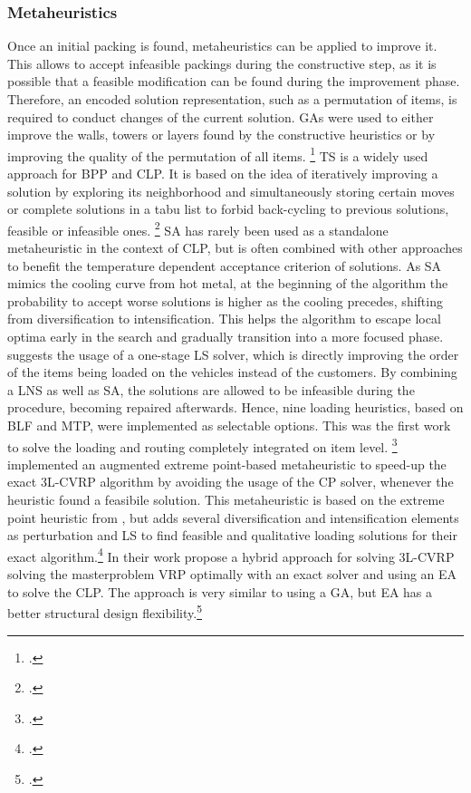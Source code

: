 \subsubsection{Metaheuristics}
Once an initial packing is found, metaheuristics can be applied to improve it.
This allows to accept infeasible packings during the constructive step,
as it is possible that a feasible modification can be found during the improvement phase.
Therefore, an encoded solution representation, such as a permutation of items, is required
to conduct changes of the current solution. \Glspl{GA} were
used to either improve the walls, towers or layers found by the constructive heuristics
or by improving the quality of the permutation of all items. \footcite[cf.][]{gehring_genetic_1997}
\Gls{TS} is a widely used approach for \gls{BPP} and \gls{CLP}. It is based on
the idea of iteratively improving a solution by exploring its neighborhood and simultaneously
storing certain moves or complete solutions in a tabu list to forbid back-cycling to
previous solutions, feasible or infeasible ones. \footcite[cf.][p. 344f]{gendreau_tabu_2006}
\Gls{SA} has rarely been used as a standalone metaheuristic in the context of \gls{CLP}, but is often
combined with other approaches to benefit the temperature dependent acceptance criterion of
solutions. As \gls{SA} mimics the cooling curve from hot metal, at the beginning of the algorithm the probability
to accept worse solutions is higher as the cooling precedes, shifting from diversification to
intensification. This helps the algorithm to escape local optima
early in the search and gradually transition into a more focused phase. \cite{ceschia_local_2013} suggests
the usage of a one-stage \gls{LS} solver, which is directly improving the order of the items being
loaded on the vehicles instead of the customers. By combining a \gls{LNS} as
well as \gls{SA}, the solutions are allowed to be infeasible during the procedure, becoming repaired afterwards.
Hence, nine loading heuristics, based on \gls{BLF} and \gls{MTP}, were implemented as selectable options.
This was the first work to
solve the loading and routing completely integrated on item level. \footcite[cf.][pp. 1142--1145]{ceschia_local_2013}
\cite{tamke_branch-and-cut_2024} implemented an augmented extreme point-based metaheuristic
to speed-up the exact \gls{3L-CVRP} algorithm by avoiding the usage of the \gls{CP} solver, whenever the heuristic
found a feasibile solution. This metaheuristic is based on the extreme point heuristic from \cite{zhang_evolutionary_2015},
but adds several diversification and intensification elements as perturbation and \gls{LS} to find
feasible and qualitative loading solutions for their exact algorithm.\footcite[cf.][pp. 11--13]{tamke_branch-and-cut_2024}
In their work \cite{kucuk_constraint_2022} propose a hybrid approach for solving \gls{3L-CVRP} solving the
masterproblem \gls{VRP} optimally with an exact solver and using an \gls{EA}
to solve the \gls{CLP}. The approach is very similar to using a \gls{GA}, but \gls{EA}
has a better structural design flexibility.\footcite[cf.][pp. 5--8]{kucuk_constraint_2022}

